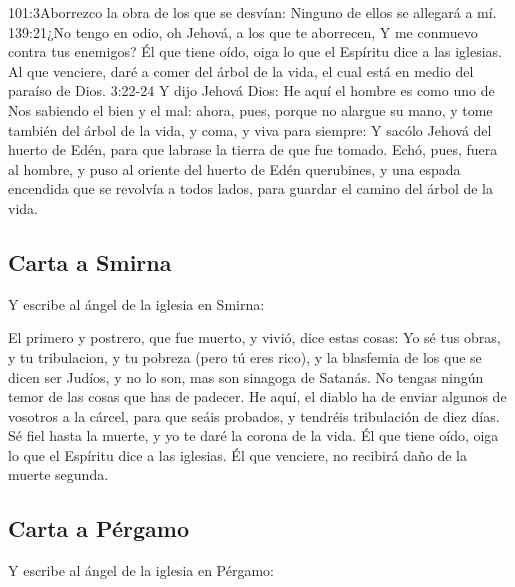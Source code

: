 			{101:3}{Aborrezco la obra de los que se desvían: Ninguno de ellos se allegará a mí.}%
			{139:21}{¿No tengo en odio, oh Jehová, a los que te aborrecen, Y me conmuevo contra tus enemigos?} %
Él que tiene oído, oiga lo que el Espíritu dice a las iglesias. Al que venciere, daré a comer del árbol de la vida, el cual está en medio del paraíso de Dios.%
				{3:22-24}{ Y dijo Jehová Dios: He aquí el hombre es como uno de Nos sabiendo el bien y el mal: ahora, pues, porque no alargue su mano, y tome también del árbol de la vida, y coma, y viva para siempre: Y sacólo Jehová del huerto de Edén, para que labrase la tierra de que fue tomado. Echó, pues, fuera al hombre, y puso al oriente del huerto de Edén querubines, y una espada encendida que se revolvía a todos lados, para guardar el camino del árbol de la vida.}
\subsection*{Carta a Smirna}
Y escribe al ángel de la iglesia en Smirna:

El primero y postrero, que fue muerto, y vivió, dice estas cosas: %
Yo sé tus obras, y tu tribulacion, y tu pobreza (pero tú eres rico), y la blasfemia de los que se dicen ser Judíos, y no lo son, mas son sinagoga de Satanás. %
No tengas ningún temor de las cosas que has de padecer. He aquí, el diablo ha de enviar algunos de vosotros a la cárcel, para que seáis probados, y tendréis tribulación de diez días.%
 Sé fiel hasta la muerte, y yo te daré la corona de la vida. %
Él que tiene oído, oiga lo que el Espíritu dice a las iglesias. Él que venciere, no recibirá daño de la muerte segunda.
\subsection*{Carta a Pérgamo}
Y escribe al ángel de la iglesia en Pérgamo:

